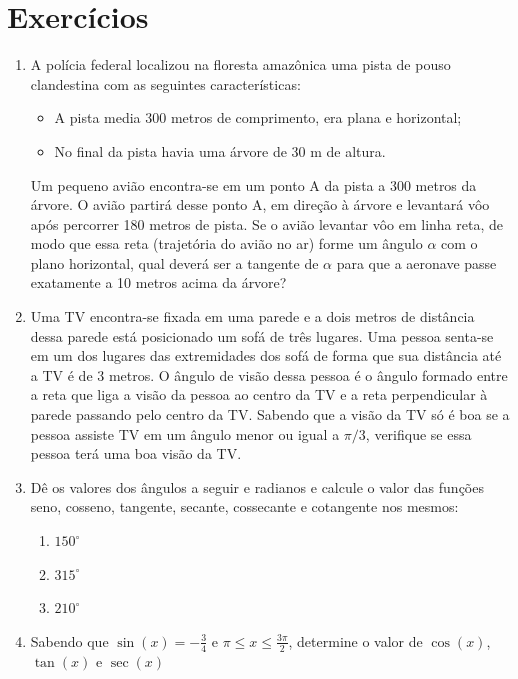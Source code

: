 \section{Exercícios}

\begin{enumerate}
\item A polícia federal localizou na floresta amazônica uma pista de pouso clandestina com as
seguintes características:
\begin{itemize}
\item A pista media 300 metros de comprimento, era plana e horizontal;
\item No final da pista havia uma árvore de 30 m de altura.
\end{itemize}
Um pequeno avião encontra-se em um ponto A da pista a 300 metros da árvore. O avião partirá desse ponto A, em direção à árvore e levantará vôo após percorrer 180 metros de pista. Se o avião levantar vôo em linha reta, de modo que essa reta (trajetória do avião no ar) forme um ângulo $\alpha$ com o plano horizontal, qual deverá ser a tangente de $\alpha$ para que a aeronave passe exatamente a 10 metros acima da árvore?

\item Uma TV encontra-se fixada em uma parede e a dois metros de distância dessa parede está posicionado um sofá de três lugares. Uma pessoa senta-se em um dos lugares das extremidades dos sofá de forma que sua distância até a TV é de 3 metros. O ângulo de visão dessa pessoa é o ângulo formado entre a reta que liga a visão da pessoa ao centro da TV e a reta perpendicular à parede passando pelo centro da TV. Sabendo que a visão da TV só é boa se a pessoa assiste TV em um ângulo menor ou igual a $\pi/3$, verifique se essa pessoa terá uma boa visão da TV.
\item Dê os valores dos ângulos a seguir e radianos e calcule o valor das funções seno, cosseno, tangente, secante, cossecante e cotangente nos mesmos:
\begin{enumerate}
  \item $150^{\circ}$
  \item $315^{\circ}$
  \item $210^{\circ}$
\end{enumerate}

\item Sabendo que $\sin(x)=-\frac{3}{4}$ e $\pi \leq x \leq \frac{3\pi}{2}$, determine o valor de $\cos(x)$, $\tan(x)$ e $\sec(x)$


\end{enumerate}
